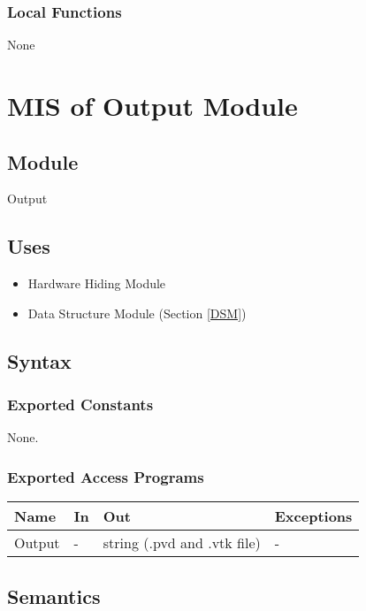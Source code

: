 \documentclass[12pt, titlepage]{article}
\begin{document}
	\subsubsection{Local Functions}
	
	None
	
	\newpage %
	\section{MIS of Output Module} \label{OM}
	
	\subsection{Module} Output
	
	\subsection{Uses} \begin{itemize} \item Hardware Hiding Module \item Data
		Structure Module (Section \ref{DSM})
		
	\end{itemize}
	
	\subsection{Syntax}
	
	\subsubsection{Exported Constants} None. \subsubsection{Exported Access
		Programs}
	
	\begin{center} \begin{tabular}{p{2cm} p{4cm} p{4cm} p{2cm}} \hline
			\textbf{Name} & \textbf{In} & \textbf{Out} & \textbf{Exceptions} \\ \hline
			Output& - & string (.pvd and .vtk file) & - \\
			
			\hline \end{tabular} \end{center}
	
	\subsection{Semantics}
	
\end{document}
